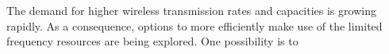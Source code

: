 The demand for higher wireless transmission rates and capacities is growing rapidly. As a consequence, options to more efficiently make use of the limited frequency resources are being explored. One possibility is to    
